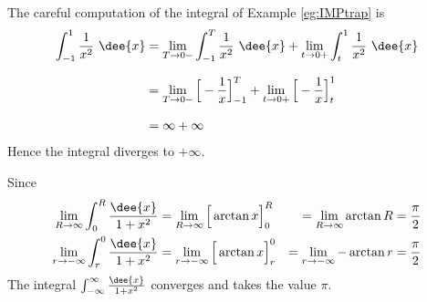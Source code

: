 \begin{eg}\label{eg:IMPtrapB}
The careful computation of the integral of Example \ref{eg:IMPtrap}
is
\begin{align*}
\int_{-1}^1\frac{1}{x^2}\ \dee{x}
&=\lim_{T\rightarrow 0- }\int_{-1}^T\frac{1}{x^2}\ \dee{x}
  +\lim_{t\rightarrow 0+} \int_t^1\frac{1}{x^2}\ \dee{x} \\[0.1in]
&=\lim_{T\rightarrow 0- }\Big[-\frac{1}{x}\Big]_{-1}^T
  +\lim_{t\rightarrow 0+}\Big[-\frac{1}{x}\Big]_t^1 \\[0.1in]
&=\infty+\infty
\end{align*}
Hence the integral diverges to $+\infty$.
\end{eg}

\begin{eg}\label{eg:IMPp5}
Since
\begin{alignat*}{5}
\lim_{R\rightarrow\infty}\int_0^R\frac{\dee{x}}{1+x^2}
&=\lim_{R\rightarrow\infty}\Big[\arctan x\Big]_0^R
&=\lim_{R\rightarrow\infty} \arctan R
&=\frac{\pi}{2} \\
\lim_{r\rightarrow-\infty}\int_r^0\frac{\dee{x}}{1+x^2}
&=\lim_{r\rightarrow-\infty}\Big[\arctan x\Big]_r^0
&=\lim_{r\rightarrow-\infty} -\arctan r
&=\frac{\pi}{2}
\end{alignat*}
The integral $\int_{-\infty}^\infty\frac{\dee{x}}{1+x^2}$ converges and takes
the value $\pi$.
\end{eg}

